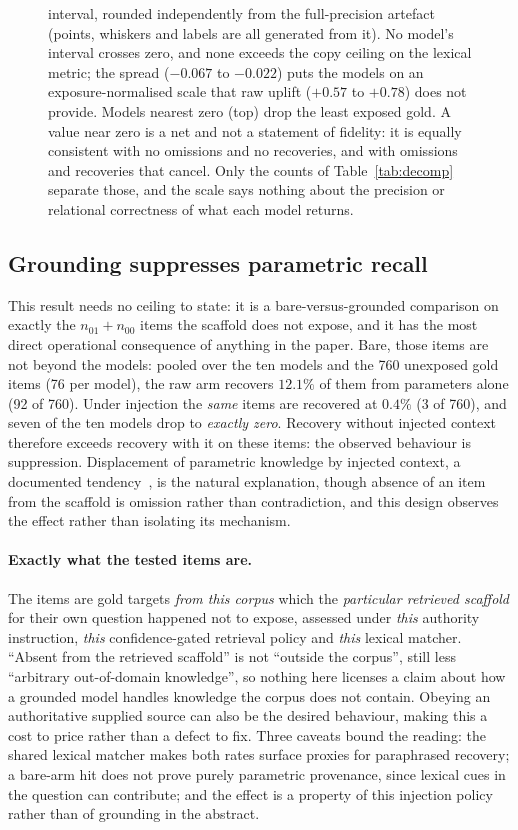 \documentclass[10pt,twocolumn]{article}
\begin{document}
\begin{figure}[t]
{interval, rounded independently from the full-precision artefact (points, whiskers and labels are all
generated from it). No model's interval crosses zero, and none exceeds the copy ceiling on the lexical
metric; the spread ($-0.067$ to $-0.022$) puts the models on an exposure-normalised scale that raw
uplift ($+0.57$ to $+0.78$) does not provide. Models nearest zero (top) drop the least exposed gold.
A value near zero is a net and not a statement of fidelity: it is equally consistent with no omissions
and no recoveries, and with omissions and recoveries that cancel. Only the counts of
Table~\ref{tab:decomp} separate those, and the scale says nothing about the precision or relational
correctness of what each model returns.}
\label{fig:gain}
\end{figure}

\subsection{Grounding suppresses parametric recall}\label{sec:suppression}
This result needs no ceiling to state: it is a bare-versus-grounded comparison on exactly the $n_{01}+n_{00}$ items the scaffold does not expose, and it has the most direct operational consequence of anything in the paper. Bare, those items are not beyond the models: pooled over the ten models and the 760 unexposed gold items (76 per model), the raw arm recovers $\mathbf{12.1\%}$ of them from parameters alone (92 of 760). Under injection the \emph{same} items are recovered at $\mathbf{0.4\%}$ (3 of 760), and seven of the ten models drop to \emph{exactly zero}. Recovery without injected context therefore exceeds recovery with it on these items: the observed behaviour is suppression. Displacement of parametric knowledge by injected context, a documented tendency~\cite{shi2023distracted,yoran2024robust,longpre2021entity}, is the natural explanation, though absence of an item from the scaffold is omission rather than contradiction, and this design observes the effect rather than isolating its mechanism. \paragraph{Exactly what the tested items are.} The items are gold targets \emph{from this corpus} which the \emph{particular retrieved scaffold} for their own question happened not to expose, assessed under \emph{this} authority instruction, \emph{this} confidence-gated retrieval policy and \emph{this} lexical matcher. ``Absent from the retrieved scaffold'' is not ``outside the corpus'', still less ``arbitrary out-of-domain knowledge'', so nothing here licenses a claim about how a grounded model handles knowledge the corpus does not contain. Obeying an authoritative supplied source can also be the desired behaviour, making this a cost to price rather than a defect to fix. Three caveats bound the reading: the shared lexical matcher makes both rates surface proxies for paraphrased recovery; a bare-arm hit does not prove purely parametric provenance, since lexical cues in the question can contribute; and the effect is a property of this injection policy rather than of grounding in the abstract.
\end{document}
